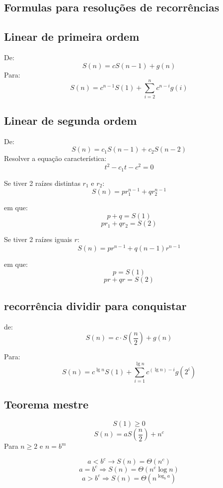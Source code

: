 \begin{tcolorbox}[sharp corners, colback=white,boxrule=1mm]
\section{Formulas para resoluções de recorrências}
\subsection{Linear de primeira ordem}
De:
\[S(n) = cS(n-1) + g(n)\]
Para:
\[S(n) = c^{n-1}S(1) + \sum_{i=2}^{n}c^{n-i}g(i)\]

\subsection{Linear de segunda ordem}
De:
\[S(n) = c_1S(n-1) + c_2S(n-2)\]
Resolver a equação característica:
\[t^2 - c_1t - c^2 = 0\]

Se tiver 2 raízes distintas $r_1$ e $r_2$:
\[S(n) = pr_1^{n-1} + qr_2^{n-1}\]

em que:
\[p + q = S(1)\]
\[pr_1 + qr_2 = S(2)\]

Se tiver 2 raízes iguais \(r\):
\[S(n) = pr^{n-1} + q(n-1)r^{n-1}\]

em que:
\[p = S(1)\]
\[pr + qr = S(2)\]

\subsection{recorrência dividir para conquistar}
de:
\[S(n) = c\cdot S\left ( \frac n2 \right ) + g(n)\]

Para:
\[S(n) = c^{\lg n}S(1) + \sum_{i=1}^{\lg n}c^{(\lg n) - i}g(2^i)\]

\subsection{Teorema mestre}
\[S(1) \geq 0\]
\[S(n) = aS\left(\frac{n}{2}\right) + n^c\]
Para \(n \geq 2\) e \(n = b^m\)

\[a < b^c \rightarrow S(n) = \Theta(n^c)\]
\[a = b^c \Rightarrow S(n) = \Theta(n^c \log n)\]
\[a > b^c \Rightarrow S(n) = \Theta(n^{\log_b a})\]
\end{tcolorbox}